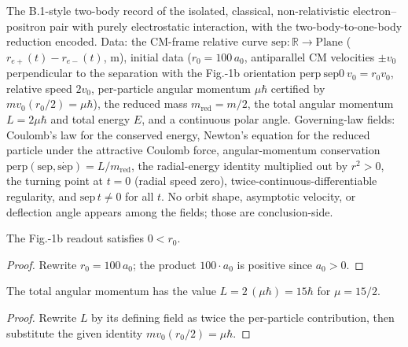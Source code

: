 \begin{definition}
\label{def:IPhO2026Problems_problem_IPhO_2026_1_B_2:CoulombScatteringData}
The B.1-style two-body record of the isolated, classical, non-relativistic
electron--positron pair with purely electrostatic interaction, with the
two-body-to-one-body reduction encoded.  Data: the CM-frame relative
curve $\mathrm{sep} : \mathbb{R} \to \mathrm{Plane}$
($r_{e+}(t) - r_{e-}(t)$, m), initial data ($r_0 = 100\,a_0$, antiparallel
CM velocities $\pm v_0$ perpendicular to the separation with the Fig.-1b
orientation $\mathrm{perp}\ \mathrm{sep0}\ v_0 = r_0 v_0$, relative speed
$2v_0$, per-particle angular momentum $\mu\hbar$ certified by
$m v_0 (r_0/2) = \mu \hbar$), the reduced mass $m_{\mathrm{red}} = m/2$,
the total angular momentum $L = 2\mu\hbar$ and total energy $E$, and a
continuous polar angle.  Governing-law fields: Coulomb's law for the
conserved energy, Newton's equation for the reduced particle under the
attractive Coulomb force, angular-momentum conservation
$\mathrm{perp}(\mathrm{sep}, \dot{\mathrm{sep}}) = L/m_{\mathrm{red}}$, the
radial-energy identity multiplied out by $r^2 > 0$, the turning point at
$t = 0$ (radial speed zero), twice-continuous-differentiable regularity,
and $\mathrm{sep}\,t \neq 0$ for all $t$.  No orbit shape, asymptotic
velocity, or deflection angle appears among the fields; those are
conclusion-side.
\end{definition}

\begin{lemma}
\label{lem:IPhO2026Problems_problem_IPhO_2026_1_B_2:initial_separation_pos}
The Fig.-1b readout satisfies $0 < r_0$.
\end{lemma}
\begin{proof}
Rewrite $r_0 = 100\,a_0$; the product $100 \cdot a_0$ is positive since
$a_0 > 0$.
\end{proof}

\begin{lemma}
\label{lem:IPhO2026Problems_problem_IPhO_2026_1_B_2:total_angular_momentum_value}
The total angular momentum has the value $L = 2\,(\mu\hbar) = 15\hbar$ for
$\mu = 15/2$.
\end{lemma}
\begin{proof}
Rewrite $L$ by its defining field as twice the per-particle contribution,
then substitute the given identity $m v_0 (r_0/2) = \mu\hbar$.
\end{proof}

